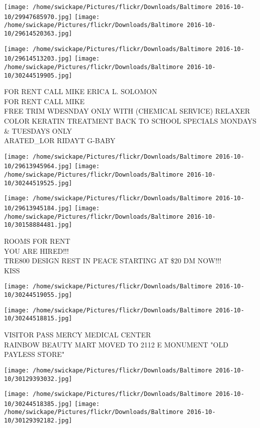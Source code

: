 \documentclass[10pt,letterpaper]{article}
\begin{document}
\texttt{[image: /home/swickape/Pictures/flickr/Downloads/Baltimore 2016-10-10/29947685970.jpg]}
\texttt{[image: /home/swickape/Pictures/flickr/Downloads/Baltimore 2016-10-10/29614520363.jpg]}

\texttt{[image: /home/swickape/Pictures/flickr/Downloads/Baltimore 2016-10-10/29614513203.jpg]}
\texttt{[image: /home/swickape/Pictures/flickr/Downloads/Baltimore 2016-10-10/30244519905.jpg]}

FOR RENT CALL MIKE ERICA L. SOLOMON\\
FOR RENT CALL MIKE\\
FREE TRIM WDESNDAY ONLY WITH (CHEMICAL SERVICE) RELAXER COLOR KERATIN TREATMENT BACK TO SCHOOL SPECIALS MONDAYS \& TUESDAYS ONLY\\
ARATED\_LOR RIDAYT G{-}BABY\\
\pagebreak

\texttt{[image: /home/swickape/Pictures/flickr/Downloads/Baltimore 2016-10-10/29613945964.jpg]}
\texttt{[image: /home/swickape/Pictures/flickr/Downloads/Baltimore 2016-10-10/30244519525.jpg]}

\texttt{[image: /home/swickape/Pictures/flickr/Downloads/Baltimore 2016-10-10/29613945184.jpg]}
\texttt{[image: /home/swickape/Pictures/flickr/Downloads/Baltimore 2016-10-10/30158884481.jpg]}

ROOMS FOR RENT\\
YOU ARE HIRED!!!\\
TRE800 DESIGN REST IN PEACE STARTING AT \$20 DM NOW!!!\\
KISS\\
\pagebreak

\texttt{[image: /home/swickape/Pictures/flickr/Downloads/Baltimore 2016-10-10/30244519055.jpg]}

\vspace{0.25in}
\texttt{[image: /home/swickape/Pictures/flickr/Downloads/Baltimore 2016-10-10/30244518815.jpg]}

VISITOR PASS MERCY MEDICAL CENTER\\
RAINBOW BEAUTY MART MOVED TO 2112 E MONUMENT "OLD PAYLESS STORE"\\
\pagebreak

\texttt{[image: /home/swickape/Pictures/flickr/Downloads/Baltimore 2016-10-10/30129393032.jpg]}

\vspace{0.25in}
\texttt{[image: /home/swickape/Pictures/flickr/Downloads/Baltimore 2016-10-10/30244518385.jpg]}
\texttt{[image: /home/swickape/Pictures/flickr/Downloads/Baltimore 2016-10-10/30129392182.jpg]}
\end{document}
